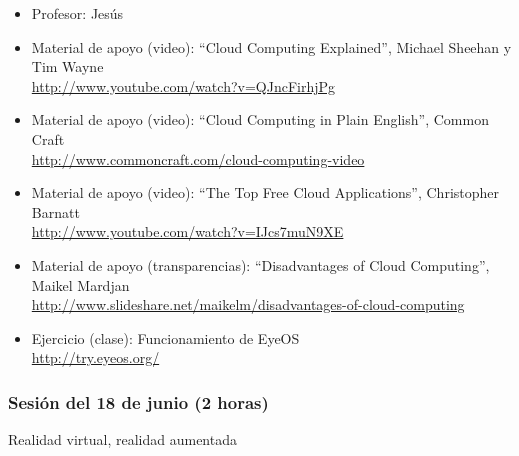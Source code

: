 \documentclass[a4paper,12pt]{article}
\begin{document}
\begin{itemize}
\item Profesor: Jesús
\item Material de apoyo (video): ``Cloud Computing Explained'', Michael Sheehan y Tim Wayne\\
  \url{http://www.youtube.com/watch?v=QJncFirhjPg}
\item Material de apoyo (video): ``Cloud Computing in Plain English'', Common Craft \\
\url{http://www.commoncraft.com/cloud-computing-video}
\item Material de apoyo (video): ``The Top Free Cloud Applications'', Christopher Barnatt \\
\url{http://www.youtube.com/watch?v=IJcs7muN9XE}
\item Material de apoyo (transparencias): ``Disadvantages of Cloud Computing'', Maikel Mardjan \\
  \url{http://www.slideshare.net/maikelm/disadvantages-of-cloud-computing}
\item Ejercicio (clase): Funcionamiento de EyeOS \\
  \url{http://try.eyeos.org/}
\end{itemize}
\subsubsection{Sesión del 18 de junio (2 horas)}

Realidad virtual, realidad aumentada
\end{document}
